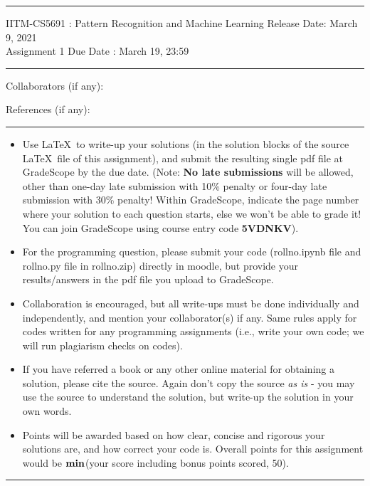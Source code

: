 \documentclass[solution,addpoints,12pt]{exam}
\begin{document}
\hrule
\vspace{3mm}
\noindent 
{\sf IITM-CS5691 : Pattern Recognition and Machine Learning  \hfill Release Date: March 9, 2021}
\\
\noindent 
{\sf Assignment 1 \hfill Due Date : March 19, 23:59}
\vspace{3mm}
\hrule
\vspace{3mm}

\noindent
{{\sf Collaborators (if any): }} %

\noindent
{{\sf References (if any): 
}} %


\vspace{3mm}
\hrule
{\small
\begin{itemize}
\item Use \LaTeX\ to write-up your solutions (in the solution blocks of the source \LaTeX\  file of this assignment), and submit the resulting single pdf file at GradeScope by the due date. (Note: {\bf No late submissions} will be allowed, other than one-day late submission with 10\% penalty or four-day late submission with 30\% penalty! Within GradeScope, indicate the page number where your solution to each question starts, else we won't be able to grade it! You can join GradeScope using course entry code \textbf{5VDNKV}).  
\item For the programming question, please submit your code (rollno.ipynb file and rollno.py file in rollno.zip) directly in moodle, but provide your results/answers in the pdf file you upload to GradeScope.
\item Collaboration is encouraged, but all write-ups must be done individually and independently, and mention your collaborator(s) if any. Same rules apply for codes written for any programming assignments (i.e., write your own code; we will run plagiarism checks on codes).
\item  If you have referred a book or any other online material for obtaining a solution, please cite the source. Again don't copy the source {\it as is} - you may use the source to understand the solution, but write-up the solution in your own words. 
\item Points will be awarded based on how clear, concise and rigorous your solutions are, and how correct your code is. Overall points for this assignment would be ${\bf min}$(your score including bonus points scored, 50).
\end{itemize}
}
\hrule
\end{document}
